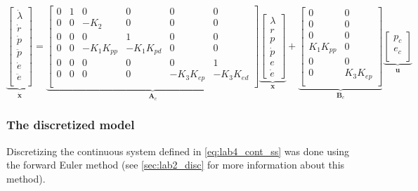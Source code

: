 \documentclass[../main.tex]{subfiles}
\begin{document}
\begin{equation}\label{eq:lab4_cont_ss}
	\underbrace{\begin{bmatrix}
			\dot \lambda \\
			\dot r \\
			\dot p \\
			\ddot p \\
			\dot e \\
			\ddot e \\
	\end{bmatrix}}_{\bm{\dot x}} = 
	\underbrace{
		\begin{bmatrix}
			0 & 1 & 0 & 0 & 0 & 0\\
			0 & 0 & -K_2 & 0 & 0 & 0\\
			0 & 0 & 0 & 1 & 0 & 0\\
			0 & 0 & -K_1 K_{pp} &  -K_1 K_{pd} & 0 & 0\\
			0 & 0 & 0 & 0 & 0 & 1 \\
			0 & 0 & 0 & 0 & -K_3K_{ep} & -K_3K_{ed} \\
		\end{bmatrix}
	}_{\bm A_c}
	\underbrace{
		\begin{bmatrix}
			\lambda \\ r \\ p \\ \dot{p} \\ e \\ \dot{e}
		\end{bmatrix}
	}_{\bm x}
	+
	\underbrace{
		\begin{bmatrix}
			0 & 0 \\
			0 & 0\\
			0 & 0\\
			K_1 K_{pp} & 0\\
			0 & 0 \\
			0 & K_3K_{ep} \\
		\end{bmatrix}
	}_{\bm B_c} 
	\underbrace{
		\begin{bmatrix}
			p_c \\
			e_c \\
		\end{bmatrix}
	}_{\bm u}
\end{equation}

\subsubsection{The discretized model}
Discretizing the continuous system defined in \cref{eq:lab4_cont_ss} was done using the forward Euler method (see \cref{sec:lab2_disc} for more information about this method).
\end{document}
